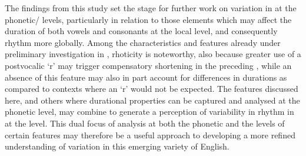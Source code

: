 \documentclass[output=paper]{langsci/langscibook}
\begin{document}
The findings from this study set the stage for further work on variation in  at the phonetic/ levels, particularly in relation to those elements which may affect the duration of both vowels and consonants at the local level, and consequently rhythm more globally. Among the characteristics and features already under preliminary investigation in \citet{Grech2015}, rhoticity is noteworthy, also because greater use of a postvocalic `r' may trigger compensatory shortening in the preceding , while an absence of this feature may also in part account for differences in  durations as compared to contexts where an `r' would not be expected. The features discussed here, and others where durational properties can be captured and analysed at the phonetic level, may combine to generate a perception of variability in rhythm in  at the  level. This dual focus of analysis at both the phonetic and the  levels of certain features may therefore be a useful approach to developing a more refined understanding of variation in this emerging variety of English.
 
 
  

\sloppy
\printbibliography[heading=subbibliography,notkeyword=this] 
\end{document}
